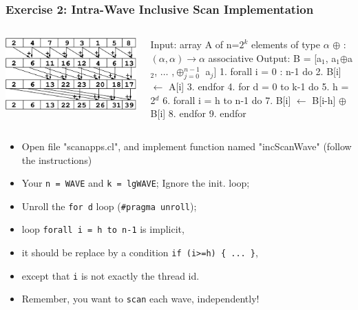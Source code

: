 \documentclass{beamer}
\newcommand{\mymath}[1]{$ #1 $}
\newcommand{\myindx}[1]{_{#1}}
\newcommand{\myindu}[1]{^{#1}}
\begin{document}
\begin{frame}[fragile,t]
  \frametitle{Exercise 2: Intra-Wave Inclusive Scan Implementation}

\begin{columns}
\includegraphics[height=15ex]{img/day3/incScanGPU} 
\begin{colorcode}
Input:  array A of n=\mymath{2\myindu{k}} elements
                       of type \mymath{\alpha}
        \mymath{\oplus} : \mymath{(\alpha,\alpha)\to\alpha} associative
Output: B = [a\mymath{\myindx{1}}, a\mymath{\myindx{1}}\mymath{\oplus}a\mymath{\myindx{2}}, \mymath{\ldots} ,\mymath{\oplus\myindx{j=0}\myindu{n-1}} a\mymath{\myindx{j}}]
1.  forall i = 0 : n-1 do
2.    B[i] \mymath{\leftarrow} A[i]
3.  endfor
4.  for d = 0 to k-1 do
5.    h = 2\mymath{\myindu{d}}
6.    forall i = h to n-1 do 
7.      B[i] \mymath{\leftarrow} B[i-h] \mymath{\oplus} B[i]
8.    endfor
9.  endfor
\end{colorcode}
\end{columns}

\begin{itemize}
    \item Open file "scanapps.cl", and implement function named "incScanWave" (follow the instructions)
    \item Your {\tt n = WAVE} and {\tt k = lgWAVE}; Ignore the init. loop;
    \item Unroll the {\tt for d} loop ({\tt \#pragma unroll});
    \item loop {\tt forall i = h to n-1} is implicit,
    \item it should be replace by a condition {\tt if (i>=h) \{ ... \}},
    \item except that {\tt i} is not exactly the thread id.
    \item Remember, you want to {\tt scan} each wave, independently!
\end{itemize}

\end{frame}
\end{document}
